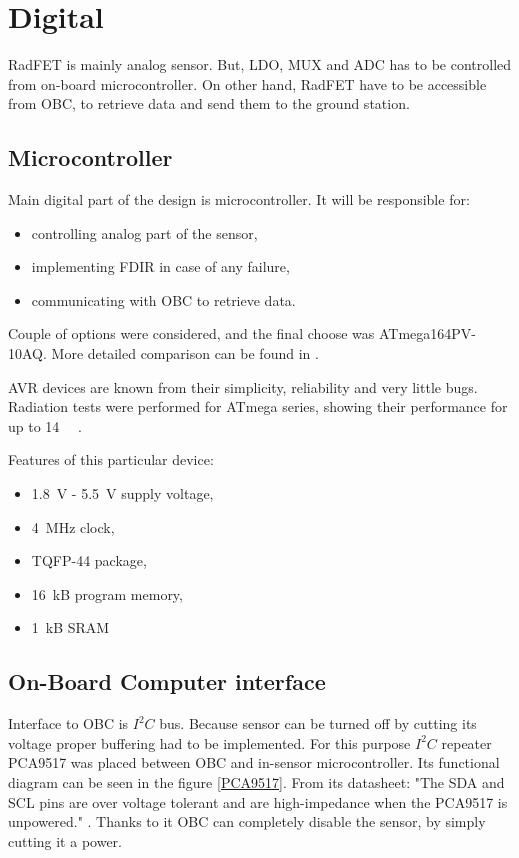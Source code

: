 \section{Digital}
    RadFET is mainly analog sensor. But, LDO, MUX and ADC has to be controlled from on-board microcontroller. On other hand, RadFET have to be accessible from OBC, to retrieve data and send them to the ground station.

    \subsection{Microcontroller}
        Main digital part of the design is microcontroller. It will be responsible for:
        \begin{itemize}
            \item controlling analog part of the sensor,
            \item implementing FDIR in case of any failure,
            \item communicating with OBC to retrieve data.
        \end{itemize}

        Couple of options were considered, and the final choose was ATmega164PV-10AQ. More detailed comparison can be found in \cite{PWSAT_EPS_CDR}.

        AVR devices are known from their simplicity, reliability and very little bugs. Radiation tests were performed for ATmega series, showing their performance for up to \SI{14}{\kilo\rad} \cite{ATMEGA128_radiation_tests}.

        Features of this particular device:
        \begin{itemize}
            \item \SI{1.8}{\volt} - \SI{5.5}{\volt} supply voltage,
            \item \SI{4}{\mega\hertz} clock,
            \item TQFP-44 package,
            \item \SI{16}{\kilo B} program memory,
            \item \SI{1}{\kilo B} SRAM
        \end{itemize}

    \subsection{On-Board Computer interface}
        Interface to OBC is $I^2C$ bus. Because sensor can be turned off by cutting its voltage proper buffering had to be implemented. For this purpose $I^2C$ repeater PCA9517 was placed between OBC and in-sensor microcontroller. Its functional diagram can be seen in the figure \ref{PCA9517}. From its datasheet: "The SDA and SCL pins are over voltage tolerant and are high-impedance when the PCA9517 is unpowered." \cite{PCA9517_datasheet}. Thanks to it OBC can completely disable the sensor, by simply cutting it a power.

